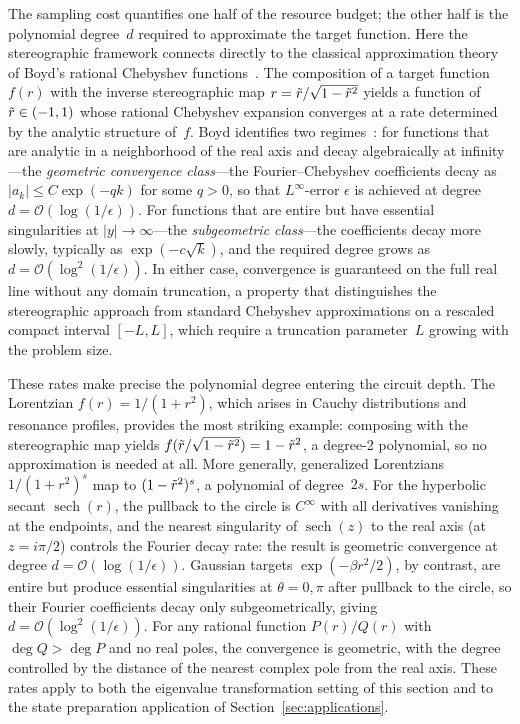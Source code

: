 The sampling cost quantifies one half of the resource budget; the
other half is the polynomial degree~$d$ required to approximate the
target function.  Here the stereographic framework connects
directly to the classical approximation theory of Boyd's rational
Chebyshev functions~\cite{Boyd1990,Boyd1987}.  The composition of a
target function $f(r)$ with the inverse stereographic map
$r = \tilde{r}/\sqrt{1-\tilde{r}^2}$ yields a function of
$\tilde{r} \in (-1,1)$ whose rational Chebyshev expansion converges
at a rate determined by the analytic structure of~$f$.  Boyd
identifies two regimes~\cite{Boyd1990}: for functions that are
analytic in a neighborhood of the real axis and decay algebraically
at infinity---the \emph{geometric convergence class}---the
Fourier--Chebyshev coefficients decay as
$|a_k| \leq C\exp(-qk)$ for some $q > 0$, so that $L^\infty$-error
$\epsilon$ is achieved at degree $d = \mathcal{O}(\log(1/\epsilon))$.
For functions that are entire but have essential singularities at
$|y| \to \infty$---the \emph{subgeometric class}---the coefficients
decay more slowly, typically as $\exp(-c\sqrt{k})$, and the required
degree grows as $d = \mathcal{O}(\log^2(1/\epsilon))$.  In either
case, convergence is guaranteed on the full real line without any
domain truncation, a property that distinguishes the stereographic
approach from standard Chebyshev approximations on a rescaled
compact interval $[-L,L]$, which require a truncation parameter~$L$
growing with the problem size.


These rates make precise the polynomial degree entering the circuit
depth.  The Lorentzian $f(r) = 1/(1+r^2)$, which arises in
Cauchy distributions and resonance profiles, provides the most
striking example: composing with the stereographic map yields
$f(\tilde{r}/\sqrt{1-\tilde{r}^2}) = 1 - \tilde{r}^2$, a degree-2
polynomial, so no approximation is needed at all.  More
generally, generalized Lorentzians $1/(1+r^2)^s$ map to
$(1-\tilde{r}^2)^s$, a polynomial of degree~$2s$.  For the
hyperbolic secant $\operatorname{sech}(r)$, the pullback to
the circle is $C^\infty$ with all derivatives vanishing at the
endpoints, and the nearest singularity of
$\operatorname{sech}(z)$ to the real axis (at $z = i\pi/2$)
controls the Fourier decay rate: the result is geometric
convergence at degree $d = \mathcal{O}(\log(1/\epsilon))$.
Gaussian targets $\exp(-\beta r^2/2)$, by contrast, are entire
but produce essential singularities at $\theta = 0, \pi$ after
pullback to the circle, so their Fourier coefficients decay only
subgeometrically, giving $d = \mathcal{O}(\log^2(1/\epsilon))$.
For any rational function $P(r)/Q(r)$ with $\deg Q > \deg P$ and
no real poles, the convergence is geometric, with the degree
controlled by the distance of the nearest complex pole from the
real axis.  These rates apply to both the eigenvalue
transformation setting of this section and to the state
preparation application of Section~\ref{sec:applications}.

